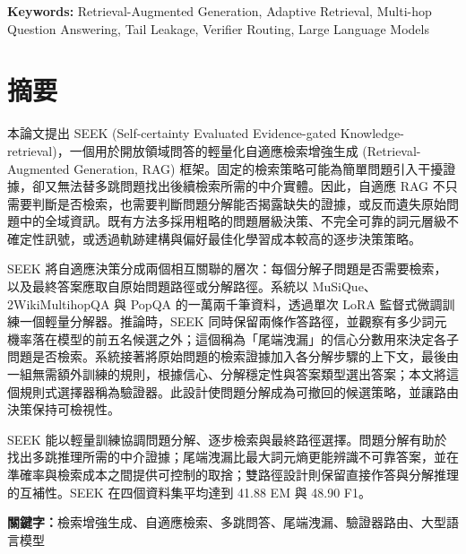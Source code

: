 \documentclass{nthu_thesis}
\begin{document}
\begin{thesiscjk}
\bigskip
\noindent\textbf{Keywords:} Retrieval-Augmented Generation, Adaptive Retrieval, Multi-hop Question Answering, Tail Leakage, Verifier Routing, Large Language Models
\setcounter{page}{1}  %
\clearpage

\chapter*{摘要}
{\hfuzz=2pt\relax\setlength{\emergencystretch}{2pt}%
本論文提出 SEEK (Self-certainty Evaluated Evidence-gated Knowledge-retrieval)，一個用於開放領域問答的輕量化自適應檢索增強生成 (Retrieval-Augmented Generation, RAG) 框架。固定的檢索策略可能為簡單問題引入干擾證據，卻又無法替多跳問題找出後續檢索所需的中介實體。因此，自適應 RAG 不只需要判斷是否檢索，也需要判斷問題分解能否揭露缺失的證據，或反而遺失原始問題中的全域資訊。既有方法多採用粗略的問題層級決策、不完全可靠的詞元層級不確定性訊號，或透過軌跡建構與偏好最佳化學習成本較高的逐步決策策略。\par}

SEEK 將自適應決策分成兩個相互關聯的層次：每個分解子問題是否需要檢索，以及最終答案應取自原始問題路徑或分解路徑。系統以 MuSiQue、2Wiki\-MultihopQA 與 PopQA 的一萬兩千筆資料，透過單次 LoRA 監督式微調訓練一個輕量分解器。推論時，SEEK 同時保留兩條作答路徑，並觀察有多少詞元機率落在模型的前五名候選之外；這個稱為「尾端洩漏」的信心分數用來決定各子問題是否檢索。系統接著將原始問題的檢索證據加入各分解步驟的上下文，最後由一組無需額外訓練的規則，根據信心、分解穩定性與答案類型選出答案；本文將這個規則式選擇器稱為驗證器。此設計使問題分解成為可撤回的候選策略，並讓路由決策保持可檢視性。

SEEK 能以輕量訓練協調問題分解、逐步檢索與最終路徑選擇。問題分解有助於找出多跳推理所需的中介證據；尾端洩漏比最大詞元熵更能辨識不可靠答案，並在準確率與檢索成本之間提供可控制的取捨；雙路徑設計則保留直接作答與分解推理的互補性。SEEK 在四個資料集平均達到 41.88 EM 與 48.90 F1。

\bigskip
\noindent\textbf{關鍵字：}檢索增強生成、自適應檢索、多跳問答、尾端洩漏、驗證器路由、大型語言模型

\clearpage




\end{thesiscjk}
\end{document}
